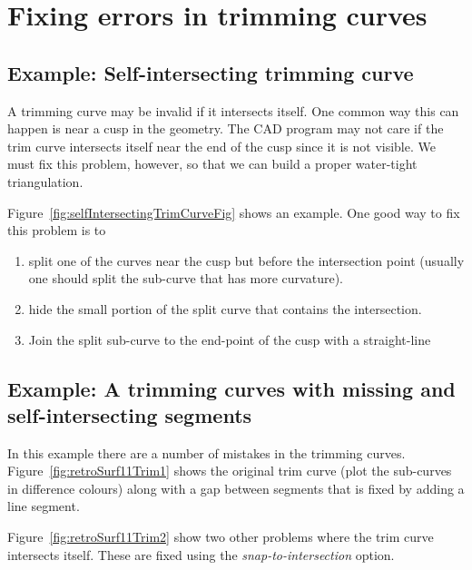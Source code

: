 \section{Fixing errors in trimming curves}\label{sec:fixingTrimCurves}


\subsection{Example: Self-intersecting trimming curve}

  
A trimming curve may be invalid if it intersects itself. One
common way this can happen is near a cusp in the geometry.
The CAD program may not care if the trim curve intersects itself
near the end of the cusp since it is not visible. We must fix this
problem, however, so that we can build a proper water-tight triangulation. 



Figure~\ref{fig:selfIntersectingTrimCurveFig} shows an example. 
One good way to fix this problem is to 
\begin{enumerate}
  \item split one of the curves near the cusp but before
    the intersection point (usually one should split the sub-curve that
        has more curvature).
  \item hide the small portion of the split curve that contains
    the intersection.
  \item Join the split sub-curve to the end-point of the cusp with
        a straight-line
\end{enumerate}




\subsection{Example: A trimming curves with missing and self-intersecting segments}\label{sec:retroSurf11}


  In this example there are a number of mistakes in the trimming curves.
Figure~\ref{fig:retroSurf11Trim1} shows the original trim curve (plot the sub-curves in difference colours)
along with a gap between segments that is fixed by adding a line segment.

Figure~\ref{fig:retroSurf11Trim2} show two other problems where the trim curve intersects
itself. These are fixed using the {\em snap-to-intersection} option.




